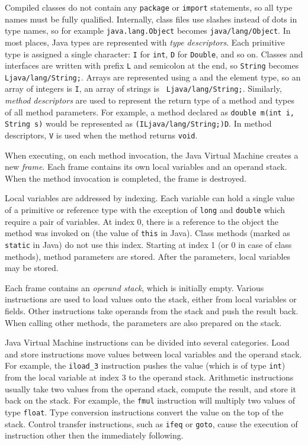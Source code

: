 Compiled classes do not contain any \texttt{package} or \texttt{import}
statements, so all type names must be fully qualified. Internally, class files
use slashes instead of dots in type names, so for example
\texttt{java.lang.Object} becomes \texttt{java/lang/Object}. In most places,
Java types are represented with \emph{type descriptors}. Each primitive type is
assigned a single character: \texttt{I} for \texttt{int}, \texttt{D} for
\texttt{Double}, and so on. Classes and interfaces are written with prefix
\texttt{L} and semicolon at the end, so \texttt{String} becomes
\texttt{Ljava/lang/String;}. Arrays are represented using a
\texttt{\leftbracket} and the element type, so an array of integers is
\texttt{\leftbracket I}, an array of strings is \texttt{\leftbracket
Ljava/lang/String;}. Similarly, \emph{method descriptors} are used to represent
the return type of a method and types of all method parameters. For example, a
method declared as \texttt{double m(int i, String s)} would be represented as
\texttt{(ILjava/lang/String;)D}. In method descriptors, \texttt{V} is used when
the method returns \texttt{void}.

When executing, on each method invocation, the Java Virtual Machine creates a
new \emph{frame}. Each frame contains its own local variables and an operand
stack. When the method invocation is completed, the frame is destroyed.

Local variables are addressed by indexing. Each variable can hold a single value
of a primitive or reference type with the exception of \texttt{long} and
\texttt{double} which require a pair of variables. At index 0, there is a
reference to the object the method was invoked on (the value of \texttt{this} in
Java). Class methods (marked as \texttt{static} in Java) do not use this index.
Starting at index 1 (or 0 in case of class methods), method parameters are
stored. After the parameters, local variables may be stored.

Each frame contains an \emph{operand stack}, which is initially empty. Various
instructions are used to load values onto the stack, either from local variables
or fields. Other instructions take operands from the stack and push the result
back. When calling other methods, the parameters are also prepared on the stack.

Java Virtual Machine instructions can be divided into several categories. Load
and store instructions move values between local variables and the operand
stack. For example, the \texttt{iload\_3} instruction pushes the value (which is
of type \texttt{int}) from the local variable at index 3 to the operand stack.
Arithmetic instructions usually take two values from the operand stack, compute
the result, and store it back on the stack. For example, the \texttt{fmul}
instruction will multiply two values of type \texttt{float}. Type conversion
instructions convert the value on the top of the stack. Control transfer
instructions, such as \texttt{ifeq} or \texttt{goto}, cause the execution of
instruction other then the immediately following.

